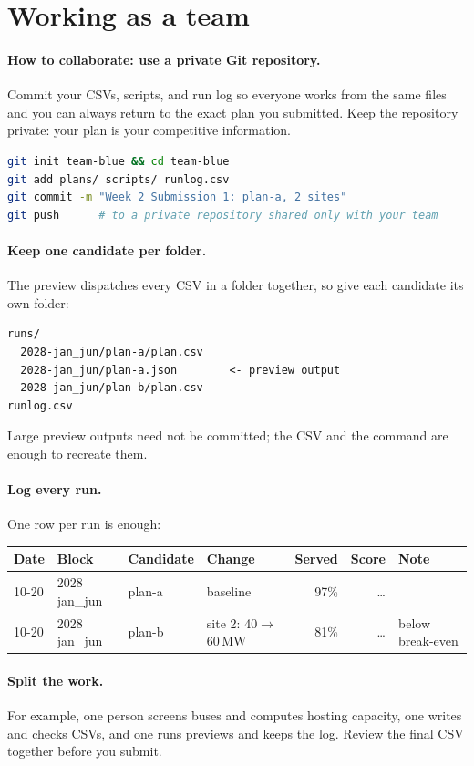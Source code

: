\documentclass[10pt]{article}
\newcommand{\MW}{\ensuremath{\,\mathrm{MW}}}
\begin{document}
\section{Working as a team}\label{app:team}

\paragraph{How to collaborate: use a private Git repository.} Commit your CSVs, scripts, and run
log so everyone works from the same files and you can always return to the
exact plan you submitted. Keep the repository private: your plan is your
competitive information.
\begin{lstlisting}[language=bash]
git init team-blue && cd team-blue
git add plans/ scripts/ runlog.csv
git commit -m "Week 2 Submission 1: plan-a, 2 sites"
git push      # to a private repository shared only with your team
\end{lstlisting}

\paragraph{Keep one candidate per folder.} The preview dispatches every CSV
in a folder together, so give each candidate its own folder:
\begin{lstlisting}
runs/
  2028-jan_jun/plan-a/plan.csv
  2028-jan_jun/plan-a.json        <- preview output
  2028-jan_jun/plan-b/plan.csv
runlog.csv
\end{lstlisting}
Large preview outputs need not be committed; the CSV and the command are enough
to recreate them.

\paragraph{Log every run.} One row per run is enough:

\begin{center}
\small
\begin{tabular}{@{}l l l l r r l@{}}
\toprule
Date & Block & Candidate & Change & Served & Score & Note\\
\midrule
10-20 & 2028 jan\_jun & plan-a & baseline & 97\% & \ldots & \\
10-20 & 2028 jan\_jun & plan-b & site 2: 40$\to$60\MW & 81\% & \ldots & below break-even\\
\bottomrule
\end{tabular}
\end{center}

\paragraph{Split the work.} For example, one person screens buses and computes
hosting capacity, one writes and checks CSVs, and one runs previews and keeps
the log. Review the final CSV together before you submit.




\end{document}
